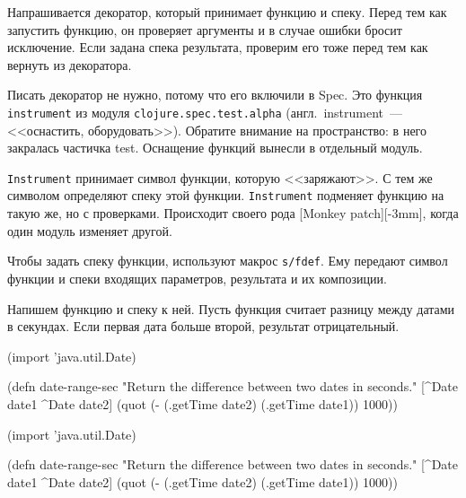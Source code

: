 
Напрашивается декоратор, который принимает функцию и спеку. Перед тем как
запустить функцию, он проверяет аргументы и в случае ошибки бросит исключение.
Если задана спека результата, проверим его тоже перед тем как вернуть из
декоратора.


Писать декоратор не нужно, потому что его включили в Spec. Это функция
\verb|instrument| из модуля \verb|clojure.spec.test.alpha|
(англ.~instru\-ment~--- <<оснастить, оборудовать>>). Обратите внимание на
пространство: в него закралась частичка test. Оснащение функций вынесли в
отдельный модуль.


\verb|Instrument| принимает символ функции, которую <<заряжают>>. С тем же
символом определяют спеку этой функции. \verb|Instrument| подменяет функцию на
такую же, но с проверками. Происходит своего рода [Monkey patch][-3mm], когда
один модуль изменяет другой.

Чтобы задать спеку функции, используют макрос \verb|s/fdef|. Ему передают символ
функции и спеки входящих параметров, результата и их композиции.


Напишем функцию и спеку к ней. Пусть функция считает разницу между датами в
секундах. Если первая дата больше второй, результат отрицательный.

\ifx\DEVICETYPE\MOBILE

\begin{english}
  \begin{clojure}
(import 'java.util.Date)

(defn date-range-sec
  "Return the difference
           between two dates in seconds."
  [^Date date1 ^Date date2]
  (quot (- (.getTime date2)
           (.getTime date1))
        1000))
  \end{clojure}
\end{english}

\else

\begin{english}
  \begin{clojure}
(import 'java.util.Date)

(defn date-range-sec
  "Return the difference between two dates in seconds."
  [^Date date1 ^Date date2]
  (quot (- (.getTime date2)
           (.getTime date1))
        1000))
  \end{clojure}
\end{english}

